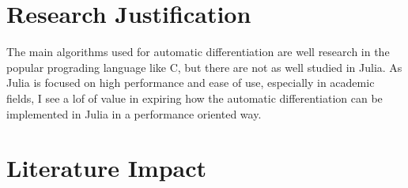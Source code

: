 \documentclass[conference,a4paper]{IEEEtran}
\begin{document}
\section{Research Justification}
The main algorithms used for automatic differentiation are well research in the popular prograding language like C, but there are not as well studied in Julia.
As Julia is focused on high performance and ease of use, especially in academic fields, I see a lof of value in expiring how the automatic differentiation can be implemented in Julia in a performance oriented way.

\section{Literature Impact}



\end{document}
